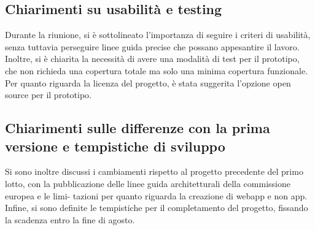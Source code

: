 \subsection{Chiarimenti su usabilità e testing}
Durante la riunione, si è sottolineato l’importanza di seguire i criteri di usabilità, senza
tuttavia perseguire linee guida precise che possano appesantire il lavoro. Inoltre, si è
chiarita la necessità di avere una modalità di test per il prototipo, che non richieda una
copertura totale ma solo una minima copertura funzionale. Per quanto riguarda la licenza
del progetto, è stata suggerita l’opzione open source per il prototipo.

\subsection{Chiarimenti sulle differenze con la prima versione e tempistiche di sviluppo}
Si sono inoltre discussi i cambiamenti rispetto al progetto precedente del primo lotto,
con la pubblicazione delle linee guida architetturali della commissione europea e le limi-
tazioni per quanto riguarda la creazione di webapp e non app. Infine, si sono definite le
tempistiche per il completamento del progetto, fissando la scadenza entro la fine di agosto.